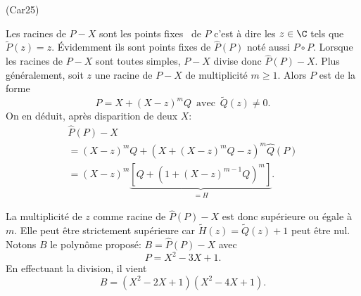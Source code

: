 \begin{tiny}(Car25)\end{tiny} Les racines de $P - X$ sont les \og points fixes\fg~ de $P$ c'est à dire les $z \in \C$ tels que $\widetilde{P}(z) = z$. \'Evidemment ils sont points fixes de $\widehat{P}(P)$ noté aussi $P\circ P$.\newline
Lorsque les racines de $P - X$ sont toutes simples, $P-X$ divise donc $\widehat{P}(P) -X$.\newline
Plus généralement, soit $z$ une racine de $P-X$ de multiplicité $m\geq1$. Alors $P$ est de la forme
\[
  P = X + (X-z)^m Q \,\text{ avec }\, \widetilde{Q}(z) \neq 0.
\]
On en déduit, après disparition de deux $X$:
\begin{multline*}
  \widehat{P}(P) - X\\
  = (X-z)^m Q + \left( X + (X-z)^m Q - z\right)^m \widehat{Q}(P)\\
  = (X-z)^m \underset{ = H}{\underbrace{\left[ Q + \left(1 + (X-z)^{m-1}Q\right)^m\right]}}.
\end{multline*}

La multiplicité de $z$ comme racine de $\widehat{P}(P) - X$ est donc supérieure ou égale à $m$. Elle peut être strictement supérieure car 
$\widetilde{H}(z)= \widetilde{Q}(z) + 1$ peut être nul.\newline
Notons $B$ le polynôme proposé:  $B = \widehat{P}(P) - X$ avec 
\[
  P = X^2 - 3X +1.
\]
En effectuant la division, il vient
\[
  B = (X^2 - 2X + 1)(X^2 - 4X +1).
\]
